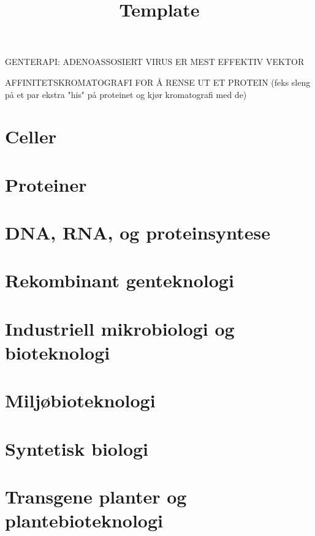 

\title{Template}





    
    GENTERAPI: ADENOASSOSIERT VIRUS ER MEST EFFEKTIV VEKTOR

    AFFINITETSKROMATOGRAFI FOR Å RENSE UT ET PROTEIN (feks sleng på et par ekstra "his" på proteinet og kjør kromatografi med de)

    \section{Celler}
    

    \section{Proteiner}
    

    \section{DNA, RNA, og proteinsyntese}
    

    \section{Rekombinant genteknologi}
    

    \section{Industriell mikrobiologi og bioteknologi}
    

    \section{Miljøbioteknologi}
    

    \section{Syntetisk biologi}
    

    \section{Transgene planter og plantebioteknologi}
    

